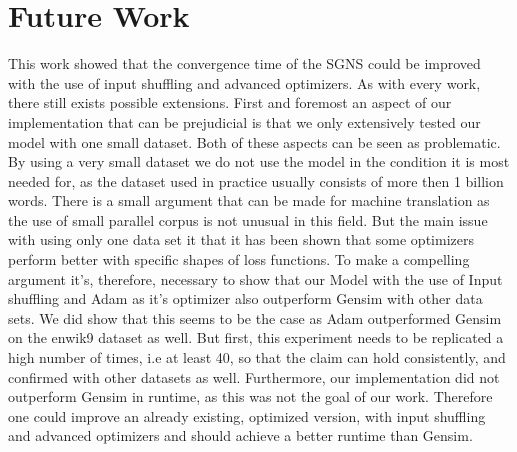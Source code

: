 \section{Future Work}
This work showed that the convergence time of the SGNS could be improved with the use of input shuffling and advanced optimizers. As with every work, there still exists possible extensions. First and foremost an aspect of our implementation that can be prejudicial is that we only extensively tested our model with one small dataset. Both of these aspects can be seen as problematic. By using a very small dataset we do not use the model in the condition it is most needed for, as the dataset used in practice usually consists of more then 1 billion words. There is a small argument that can be made for machine translation as the use of small parallel corpus is not unusual in this field. But the main issue with using only one data set it that it has been shown that some optimizers perform better with specific shapes of loss functions.  To make a compelling argument it's, therefore, necessary to show that our Model with the use of Input shuffling and Adam as it's optimizer also outperform Gensim with other data sets. We did show that this seems to be the case as Adam outperformed Gensim on the enwik9 dataset as well. But first, this experiment needs to be replicated a high number of times, i.e at least 40, so that the claim can hold consistently, and confirmed with other datasets as well.
Furthermore, our implementation did not outperform Gensim in runtime, as this was not the goal of our work. Therefore one could improve an already existing, optimized version, with input shuffling and advanced optimizers and should achieve a better runtime than Gensim.
